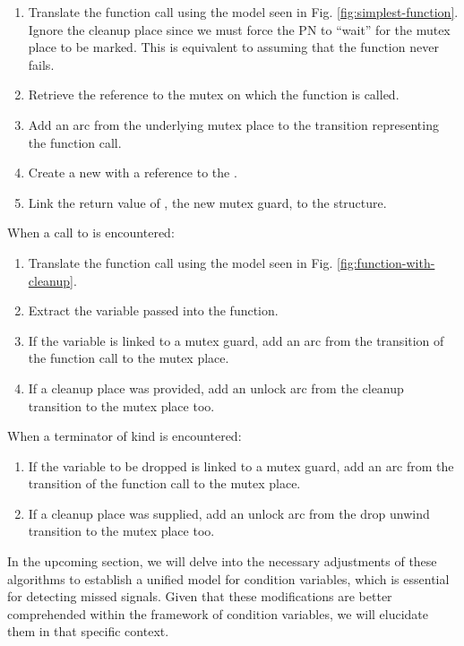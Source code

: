 \begin{enumerate}
      \item Translate the function call using the model seen in Fig. \ref{fig:simplest-function}.
            Ignore the cleanup place since we must force the \acrshort{PN}
            to ``wait'' for the mutex place to be marked.
            This is equivalent to assuming that the  function never fails.
      \item Retrieve the  reference to the mutex on which the function is called.
      \item Add an arc from the underlying mutex place to the transition representing the function call.
      \item Create a new  with a reference to the .
      \item Link the return value of ,
            the new mutex guard, to the  structure.
\end{enumerate}

When a call to  is encountered:

\begin{enumerate}
      \item Translate the function call using the model seen in Fig. \ref{fig:function-with-cleanup}.
      \item Extract the variable passed into the function.
      \item If the variable is linked to a mutex guard,
            add an arc from the transition of the function call to the mutex place.
      \item If a cleanup place was provided,
            add an unlock arc from the cleanup transition to the mutex place too.
\end{enumerate}

When a terminator of kind  is encountered:

\begin{enumerate}
      \item If the variable to be dropped is linked to a mutex guard,
            add an arc from the transition of the function call to the mutex place.
      \item If a cleanup place was supplied,
            add an unlock arc from the drop unwind transition to the mutex place too.
\end{enumerate}

In the upcoming section,
we will delve into the necessary adjustments of these algorithms to
establish a unified model for condition variables,
which is essential for detecting missed signals.
Given that these modifications are better comprehended
within the framework of condition variables,
we will elucidate them in that specific context.